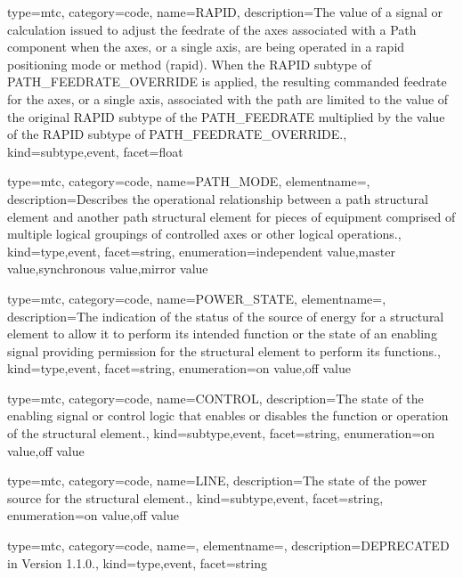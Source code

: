 {
  type=mtc,
  category=code,
  name={RAPID},
  description={The value of a signal or calculation issued to adjust the feedrate of the axes associated with a Path component when the axes, or a single axis, are being operated in a rapid positioning mode or method (rapid).   \newline When the RAPID subtype of PATH\_FEEDRATE\_OVERRIDE is applied, the resulting commanded feedrate for the axes, or a single axis, associated with the path are limited to the value of the original RAPID subtype of the PATH\_FEEDRATE multiplied by the value of the RAPID subtype of PATH\_FEEDRATE\_OVERRIDE.},
  kind={subtype,event},
  facet={\gls{float}}
}


{
  type=mtc,
  category=code,
  name={PATH\_MODE},
  elementname=,
  description={Describes the operational relationship between a \gls{path} \gls{structural element} and another \gls{path} \gls{structural element} for pieces of equipment comprised of multiple logical groupings of controlled axes or other logical operations.},
  kind={type,event},
  facet={\gls{string}},
  enumeration={\gls{independent value},\gls{master value},\gls{synchronous value},\gls{mirror value}}
}


{
  type=mtc,
  category=code,
  name={POWER\_STATE},
  elementname=,
  description={The indication of the status of the source of energy for a \gls{structural element} to allow it to perform its intended function or the state of an enabling signal providing permission for the \gls{structural element} to perform its functions.},
  kind={type,event},
  facet={\gls{string}},
  enumeration={\gls{on value},\gls{off value}}
}


{
  type=mtc,
  category=code,
  name={CONTROL},
  description={The state of the enabling signal or control logic that enables or disables the function or operation of the \gls{structural element}.},
  kind={subtype,event},
  facet={\gls{string}},
  enumeration={\gls{on value},\gls{off value}}
}


{
  type=mtc,
  category=code,
  name={LINE},
  description={The state of the power source for the \gls{structural element}.},
  kind={subtype,event},
  facet={\gls{string}},
  enumeration={\gls{on value},\gls{off value}}
}


{
  type=mtc,
  category=code,
  name=,
  elementname=,
  description={DEPRECATED in Version 1.1.0.},
  kind={type,event},
  facet={\gls{string}}
}


